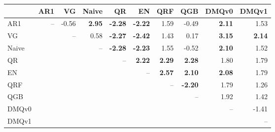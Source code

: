 \begin{tabular}{lrrrrrrrrr}
\toprule
 & AR1 & VG & Naive & QR & EN & QRF & QGB & DMQv0 & DMQv1 \\
\midrule
AR1 & -- & -0.56 & \textbf{2.95} & \textbf{-2.28} & \textbf{-2.22} & 1.59 & -0.49 & \textbf{2.11} & 1.53 \\
VG &  & -- & 0.58 & \textbf{-2.27} & \textbf{-2.42} & 1.43 & 0.17 & \textbf{3.15} & \textbf{2.14} \\
Naive &  &  & -- & \textbf{-2.28} & \textbf{-2.23} & 1.55 & -0.52 & \textbf{2.10} & 1.52 \\
QR &  &  &  & -- & \textbf{2.22} & \textbf{2.29} & \textbf{2.28} & 1.80 & 1.79 \\
EN &  &  &  &  & -- & \textbf{2.57} & \textbf{2.10} & \textbf{2.08} & 1.79 \\
QRF &  &  &  &  &  & -- & \textbf{-2.20} & 1.79 & 1.26 \\
QGB &  &  &  &  &  &  & -- & 1.92 & 1.42 \\
DMQv0 &  &  &  &  &  &  &  & -- & -1.41 \\
DMQv1 &  &  &  &  &  &  &  &  & -- \\
\bottomrule
\end{tabular}
